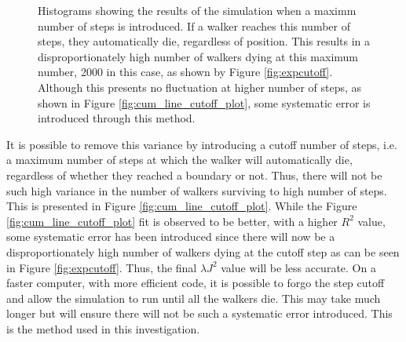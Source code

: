 \documentclass[journal]{IEEEtran}
\begin{document}
\begin{figure}[ht!]
  \centering
  \centering
  \caption{Histograms showing the results of the simulation when a maximm number
  of steps is introduced. If a walker reaches this number of steps, they
  automatically die, regardless of position. This results in a
  disproportionately high number of walkers dying at this maximum number, 2000
  in this case, as shown by Figure \ref{fig:expcutoff}. Although this presents
  no fluctuation at higher number of steps, as shown in Figure
  \ref{fig:cum_line_cutoff_plot}, some systematic error is introduced
  through this method.}
  \label{fig:cutoffplots}
\end{figure}

It is possible to remove this variance by introducing a cutoff number of steps,
i.e. a maximum number of steps at which the walker will automatically die,
regardless of whether they reached a boundary or not. Thus, there will not be
such high variance in the number of walkers surviving to high number of
steps. This is presented in Figure \ref{fig:cum_line_cutoff_plot}. While the
Figure \ref{fig:cum_line_cutoff_plot} fit is observed to be better, with a
higher $R^2$ value, some systematic error has been introduced since there will
now be a disproportionately high number of walkers dying at the cutoff step as
can be seen in Figure \ref{fig:expcutoff}. Thus, the final $\lambda J^2$ value
will be less accurate. On a faster computer, with more efficient code, it is
possible to forgo the step cutoff and allow the simulation to run until all the
walkers die. This may take much longer but will ensure there will not be such a
systematic error introduced. This is the method used in this investigation.
\end{document}
